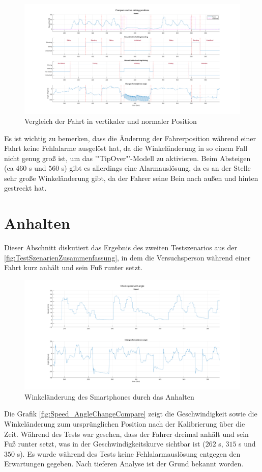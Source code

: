 \begin{figure}[H]
	\centering
	\includegraphics[width=\linewidth]{Bilder/Speed_Groundtruth_WalkStand_Compare.png}
	\caption{Vergleich der Fahrt in vertikaler und normaler Position} %
	\label{fig:Speed_Groundtruth_WalkStand_Compare}
\end{figure}

Es ist wichtig zu bemerken, dass die Änderung der Fahrerposition während einer Fahrt keine Fehlalarme ausgelöst hat, da die Winkeländerung in so einem Fall nicht genug groß ist, um das '"TipOver"'-Modell zu aktivieren. Beim Absteigen (ca $460$ s und $560$ s) gibt es allerdings eine Alarmauslösung, da es an der Stelle sehr große Winkeländerung gibt, da der Fahrer seine Bein nach außen und hinten gestreckt hat.
\section{Anhalten}
Dieser Abschnitt diskutiert das Ergebnis des zweiten Testszenarios aus der \autoref{fig:TestSzenarienZusammenfassung}, in dem die Versuchsperson während einer Fahrt kurz anhält und sein Fuß runter setzt.

\begin{figure}[H]
	\centering
	\includegraphics[width=\linewidth]{Bilder/Speed_AngleChangeCompare.png}
	\caption{Winkeländerung des Smartphones durch das Anhalten}
	\label{fig:Speed_AngleChangeCompare}
\end{figure}
Die Grafik \autoref{fig:Speed_AngleChangeCompare} zeigt die Geschwindigkeit sowie die Winkeländerung zum ursprünglichen Position nach der Kalibrierung über die Zeit.
Während des Tests war gesehen, dass der Fahrer dreimal anhält und sein Fuß runter setzt, was in der Geschwindigkeitskurve sichtbar ist ($262$ s, $315$ s und $350$ s). Es wurde während des Tests keine Fehlalarmauslösung entgegen den Erwartungen gegeben. Nach tieferen Analyse ist der Grund bekannt worden.


